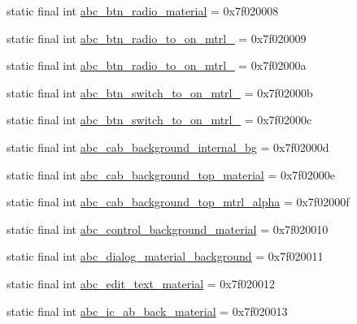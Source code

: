 \begin{CompactItemize}
static final int \hyperlink{classandroid_1_1support_1_1v7_1_1recyclerview_1_1_r_1_1drawable_caffc3b45301dd12d9938896ea4bc5d3}{abc\_\-btn\_\-radio\_\-material} = 0x7f020008
\item 
static final int \hyperlink{classandroid_1_1support_1_1v7_1_1recyclerview_1_1_r_1_1drawable_6c9460fda9f2a93da5e95e3ed437c1cc}{abc\_\-btn\_\-radio\_\-to\_\-on\_\-mtrl\_} = 0x7f020009
\item 
static final int \hyperlink{classandroid_1_1support_1_1v7_1_1recyclerview_1_1_r_1_1drawable_9c8d94550ab5bc216bbae178f28d931c}{abc\_\-btn\_\-radio\_\-to\_\-on\_\-mtrl\_} = 0x7f02000a
\item 
static final int \hyperlink{classandroid_1_1support_1_1v7_1_1recyclerview_1_1_r_1_1drawable_7534bfa0ce3576a35fbc2538ec7b3a03}{abc\_\-btn\_\-switch\_\-to\_\-on\_\-mtrl\_} = 0x7f02000b
\item 
static final int \hyperlink{classandroid_1_1support_1_1v7_1_1recyclerview_1_1_r_1_1drawable_e62b139a09ad0581e4f11d5d41a19a9c}{abc\_\-btn\_\-switch\_\-to\_\-on\_\-mtrl\_} = 0x7f02000c
\item 
static final int \hyperlink{classandroid_1_1support_1_1v7_1_1recyclerview_1_1_r_1_1drawable_490661560b680dd1c0cb8149c8d2e875}{abc\_\-cab\_\-background\_\-internal\_\-bg} = 0x7f02000d
\item 
static final int \hyperlink{classandroid_1_1support_1_1v7_1_1recyclerview_1_1_r_1_1drawable_9946ee7bf8018aeb33ca8729f2b193c4}{abc\_\-cab\_\-background\_\-top\_\-material} = 0x7f02000e
\item 
static final int \hyperlink{classandroid_1_1support_1_1v7_1_1recyclerview_1_1_r_1_1drawable_40c7647e10d80cd545f78a473459a7a1}{abc\_\-cab\_\-background\_\-top\_\-mtrl\_\-alpha} = 0x7f02000f
\item 
static final int \hyperlink{classandroid_1_1support_1_1v7_1_1recyclerview_1_1_r_1_1drawable_96571db06d85fd0b109e4784d2599eb2}{abc\_\-control\_\-background\_\-material} = 0x7f020010
\item 
static final int \hyperlink{classandroid_1_1support_1_1v7_1_1recyclerview_1_1_r_1_1drawable_877c76b5f421b9c257785597541245be}{abc\_\-dialog\_\-material\_\-background} = 0x7f020011
\item 
static final int \hyperlink{classandroid_1_1support_1_1v7_1_1recyclerview_1_1_r_1_1drawable_aa4a39c2f254fb89b41ca03577e8d23d}{abc\_\-edit\_\-text\_\-material} = 0x7f020012
\item 
static final int \hyperlink{classandroid_1_1support_1_1v7_1_1recyclerview_1_1_r_1_1drawable_74201ba6d54ee29d7a41f2ed73e8123a}{abc\_\-ic\_\-ab\_\-back\_\-material} = 0x7f020013

\end{CompactItemize}
